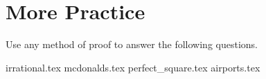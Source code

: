 \documentclass{exam}
\begin{document}
\section{More Practice}
Use any method of proof to answer the following questions.
\begin{questions}
{irrational.tex}
{mcdonalds.tex}
{perfect_square.tex}
{airports.tex}
\end{questions}
\end{document}
